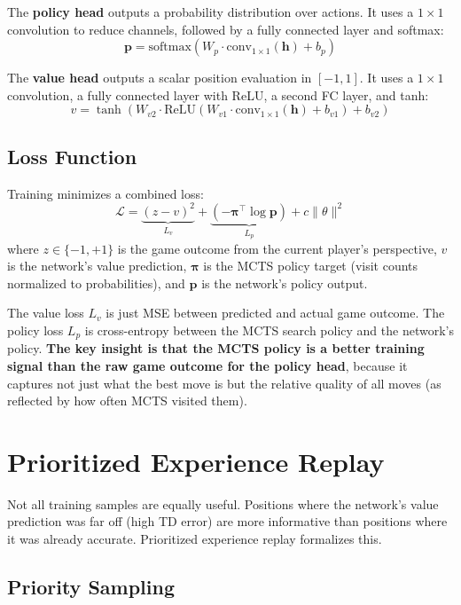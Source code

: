 \documentclass[11pt]{article}
\begin{document}
The \textbf{policy head} outputs a probability distribution over actions. It uses a $1 \times 1$ convolution to reduce channels, followed by a fully connected layer and softmax:
\[
\mathbf{p} = \text{softmax}(W_p \cdot \text{conv}_{1 \times 1}(\mathbf{h}) + b_p)
\]

The \textbf{value head} outputs a scalar position evaluation in $[-1, 1]$. It uses a $1 \times 1$ convolution, a fully connected layer with ReLU, a second FC layer, and tanh:
\[
v = \tanh(W_{v2} \cdot \text{ReLU}(W_{v1} \cdot \text{conv}_{1 \times 1}(\mathbf{h}) + b_{v1}) + b_{v2})
\]

\subsection{Loss Function}

Training minimizes a combined loss:
\begin{equation}\label{eq:loss}
\mathcal{L} = \underbrace{(z - v)^2}_{L_v} + \underbrace{(-\boldsymbol{\pi}^\top \log \mathbf{p})}_{L_p} + c \|\theta\|^2
\end{equation}
where $z \in \{-1, +1\}$ is the game outcome from the current player's perspective, $v$ is the network's value prediction, $\boldsymbol{\pi}$ is the MCTS policy target (visit counts normalized to probabilities), and $\mathbf{p}$ is the network's policy output.

The value loss $L_v$ is just MSE between predicted and actual game outcome. The policy loss $L_p$ is cross-entropy between the MCTS search policy and the network's policy. \textbf{The key insight is that the MCTS policy is a better training signal than the raw game outcome for the policy head}, because it captures not just what the best move is but the relative quality of all moves (as reflected by how often MCTS visited them).

\section{Prioritized Experience Replay}

Not all training samples are equally useful. Positions where the network's value prediction was far off (high TD error) are more informative than positions where it was already accurate. Prioritized experience replay \citep{schaul2016per} formalizes this.

\subsection{Priority Sampling}
\end{document}
